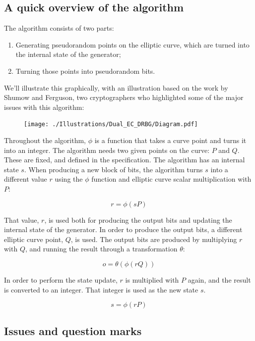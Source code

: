 \documentclass[11pt,ebook,table,dvipsnames]{memoir}
\begin{document}
\subsection{A quick overview of the algorithm}
\label{sec-2-10-5-2}

The algorithm consists of two parts:

\begin{enumerate}
\item Generating pseudorandom points on the elliptic curve, which are
turned into the internal state of the generator;
\item Turning those points into pseudorandom bits.
\end{enumerate}

We'll illustrate this graphically, with an illustration based on the
work by Shumow and Ferguson, two cryptographers who highlighted some
of the major issues with this algorithm:

\begin{figure}
\centering
\texttt{[image: ./Illustrations/Dual\_EC\_DRBG/Diagram.pdf]}
\end{figure}

Throughout the algorithm, $\phi$ is a function that takes a curve
point and turns it into an integer. The algorithm needs two given
points on the curve: $P$ and $Q$. These are fixed, and defined in the
specification. The algorithm has an internal state $s$. When producing
a new block of bits, the algorithm turns $s$ into a different value
$r$ using the $\phi$ function and elliptic curve scalar multiplication
with $P$:

\[
r = \phi(sP)
\]

That value, $r$, is used both for producing the output bits and
updating the internal state of the generator. In order to produce the
output bits, a different elliptic curve point, $Q$, is used. The
output bits are produced by multiplying $r$ with $Q$, and running the
result through a transformation $\theta$:

\[
o = \theta(\phi(rQ))
\]

In order to perform the state update, $r$ is multiplied with $P$
again, and the result is converted to an integer. That integer is used
as the new state $s$.

\[
s = \phi(rP)
\]
\subsection{Issues and question marks}
\label{sec-2-10-5-3}
\end{document}
